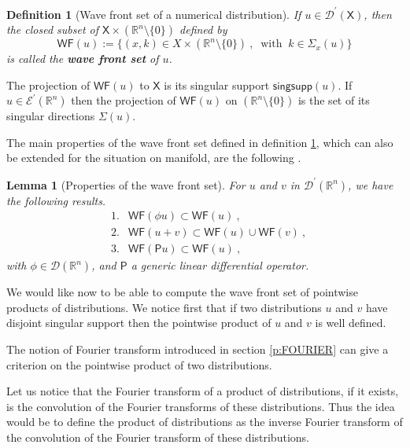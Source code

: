 \documentclass[11pt]{book}
\newcommand{\WF}{\mathsf{WF}}
\newcommand{\Dcal}{\mathcal{D}}
\newcommand{\Ecal}{\mathcal{E}}
\newcommand{\Rbb}{\mathbb{R}}
\newcommand{\Psf}{\mathsf{P}}
\newcommand{\Xsf}{\mathsf{X}}
\theoremstyle{break}
\newtheorem{lemma}{Lemma}[chapter]
\newtheorem{definition}{Definition}[chapter]
\begin{document}
\begin{definition}[Wave front set of a numerical distribution]\label{def:wf}
If $u \in \Dcal^\prime(\Xsf)$, then the closed subset of $\Xsf \times (\Rbb^n \setminus \{0\})$ defined by
%
\begin{equation*}
\WF(u) := \bigg\{ (x,k) \in X \times (\Rbb^n \setminus \{0\}) \ , \ \mbox{ with } \ k \in \Sigma_x(u) \bigg\}
\end{equation*}
%
is called the \textbf{wave front set} of $u$.  
\end{definition}


The projection of $\WF(u)$ to $\Xsf$ is its singular support $\mathsf{singsupp}(u)$. If $u \in \Ecal^\prime(\Rbb^n)$ then the projection of $\WF(u)$ on $(\Rbb^n \setminus \{0\})$ is the set of its singular directions $\Sigma(u)$. 


The main properties of the wave front set defined in definition \ref{def:wf}, which can also be extended for the situation on manifold, are the following \cite{hormander_analysis_1990}.


\begin{lemma}[Properties of the wave front set]\label{lem:prop_wf}
For $u$ and $v$ in $\Dcal^\prime(\Rbb^n)$, we have the following results.
%
\begin{eqnarray*}
&1.& \WF(\phi u) \subset \WF(u) \ , \\
&2.& \WF(u+v) \subset \WF(u) \cup \WF(v) \ , \\ 
&3.& \WF(\Psf u) \subset \WF(u) \ , 
\end{eqnarray*}
%
with $\phi\in\Dcal(\Rbb^n)$, and $\Psf$ a generic linear differential operator. 
\end{lemma}


\bigskip


We would like now to be able to compute the wave front set of pointwise products of distributions. We notice first that if two distributions $u$ and $v$ have disjoint singular support then the pointwise product of $u$ and $v$ is well defined.


\bigskip


The notion of Fourier transform introduced in section \ref{p:FOURIER} can give a criterion on the pointwise product of two distributions. 


Let us notice that the Fourier transform of a product of distributions, if it exists, is the convolution of the Fourier transforms of these distributions. Thus the idea would be to define the product of distributions as the inverse Fourier transform of the convolution of the Fourier transform of these distributions.
\end{document}
